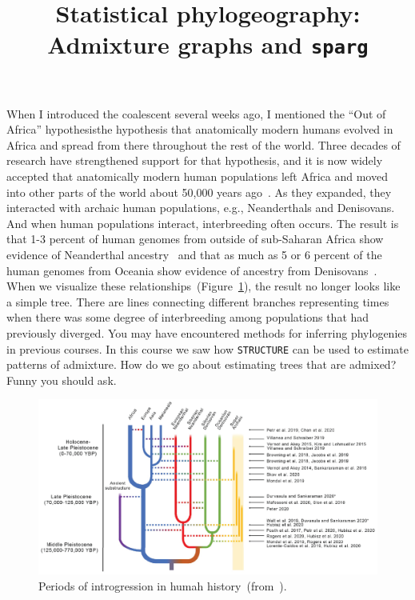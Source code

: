 \documentclass[12pt]{article}
\title{Statistical phylogeography: Admixture graphs and {\tt sparg}}
\begin{document}
\maketitle

\thispagestyle{first}

When I introduced the coalescent several weeks ago, I mentioned the
``Out of Africa'' hypothesis{\dash}the hypothesis that anatomically
modern humans evolved in Africa and spread from there throughout the
rest of the world. Three decades of research have strengthened support
for that hypothesis, and it is now widely accepted that anatomically
modern human populations left Africa and moved into other parts of the
world about 50,000 years ago~\cite{Karmin-etal-2015}. As they
expanded, they interacted with archaic human populations, e.g.,
Neanderthals and Denisovans. And when human populations interact,
interbreeding often occurs. The result is that 1-3 percent of human
genomes from outside of sub-Saharan Africa show evidence of
Neanderthal ancestry~\cite{Prufer-etal-2014} and that as much as 5 or
6 percent of the human genomes from Oceania show evidence of ancestry
from Denisovans~\cite{Meyer-etal-2012}. When we visualize these
relationships~(Figure~\ref{fig:human-neanderthal-denisovan}), the
result no longer looks like a simple tree. There are lines connecting
different branches representing times when there was some degree of
interbreeding among populations that had previously diverged. You may
have encountered methods for inferring phylogenies in previous
courses. In this course we saw how {\tt STRUCTURE} can be used to
estimate patterns of admixture. How do we go about estimating trees
that are admixed? Funny you should ask.

\begin{figure}
  \begin{center}
    \includegraphics[width=14cm]{human-neanderthal-denisovan.eps}
  \end{center}
  \caption{Periods of introgression in humah
    history~(from~\cite{Ahlquist-etal-2021}).}\label{fig:human-neanderthal-denisovan}
\end{figure}
\end{document}
